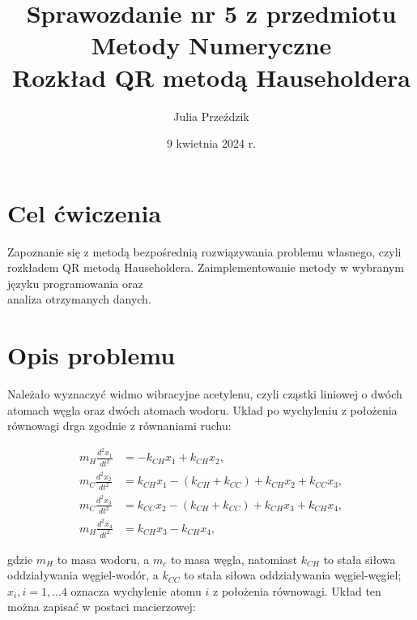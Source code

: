 \documentclass{article}
\begin{document}
\Large

\title{\LARGE Sprawozdanie nr 5 z przedmiotu Metody Numeryczne\\
       \LARGE Rozkład QR metodą Hauseholdera}
\author{Julia Przeździk}
\date{9 kwietnia 2024 r.}
\maketitle

\large

\section{Cel ćwiczenia}
Zapoznanie się z metodą bezpośrednią rozwiązywania problemu własnego, czyli rozkładem QR metodą Hauseholdera. Zaimplementowanie metody w wybranym języku programowania oraz \\ analiza otrzymanych danych.

\section{Opis problemu}
Należało wyznaczyć widmo wibracyjne acetylenu, czyli cząstki liniowej o dwóch atomach węgla oraz dwóch atomach wodoru. Układ po wychyleniu z położenia równowagi drga zgodnie z równaniami ruchu:

\begin{equation}
\begin{aligned}
m_H \frac{d^2 x_1}{dt^2} &= -k_{CH} x_1 + k_{CH} x_2, \\
m_C \frac{d^2 x_2}{dt^2} &= k_{CH} x_1 - (k_{CH} + k_{CC}) + k_{CH}x_2 + k_{CC} x_3, \\
m_C \frac{d^2 x_3}{dt^2} &= k_{CC} x_2 - (k_{CH} + k_{CC}) + k_{CH}x_3 + k_{CH} x_4, \\
m_H \frac{d^2 x_4}{dt^2} &= k_{CH} x_3 - k_{CH} x_4,
\end{aligned}
\end{equation}

\noindent
gdzie $m_H$ to masa wodoru, a $m_c$ to masa węgla, natomiast $k_{CH}$ to stała siłowa oddziaływania węgiel-wodór, a $k_{CC}$ to stała siłowa oddziaływania węgiel-węgiel; $x_i, i = 1, ... 4$ oznacza wychylenie atomu $i$ z położenia równowagi. Układ ten można zapisać w postaci macierzowej:
\end{document}
